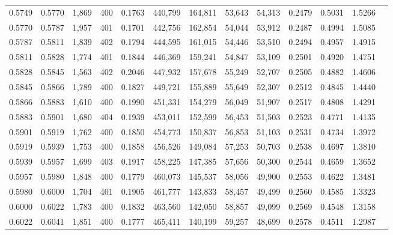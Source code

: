 \begin{tabular}{rrrrrrrrrrrrr}
0.5749 & 0.5770 & 1,869 & 400 &                                     0.1763 & 440,799 & 164,811 &  53,643 &  54,313 & 0.2479 & 0.5031 & 1.5266 \\
0.5770 & 0.5787 & 1,957 & 401 &                                     0.1701 & 442,756 & 162,854 &  54,044 &  53,912 & 0.2487 & 0.4994 & 1.5085 \\
0.5787 & 0.5811 & 1,839 & 402 &                                     0.1794 & 444,595 & 161,015 &  54,446 &  53,510 & 0.2494 & 0.4957 & 1.4915 \\
0.5811 & 0.5828 & 1,774 & 401 &                                     0.1844 & 446,369 & 159,241 &  54,847 &  53,109 & 0.2501 & 0.4920 & 1.4751 \\
0.5828 & 0.5845 & 1,563 & 402 &                                     0.2046 & 447,932 & 157,678 &  55,249 &  52,707 & 0.2505 & 0.4882 & 1.4606 \\
0.5845 & 0.5866 & 1,789 & 400 &                                     0.1827 & 449,721 & 155,889 &  55,649 &  52,307 & 0.2512 & 0.4845 & 1.4440 \\
0.5866 & 0.5883 & 1,610 & 400 &                                     0.1990 & 451,331 & 154,279 &  56,049 &  51,907 & 0.2517 & 0.4808 & 1.4291 \\
0.5883 & 0.5901 & 1,680 & 404 &                                     0.1939 & 453,011 & 152,599 &  56,453 &  51,503 & 0.2523 & 0.4771 & 1.4135 \\
0.5901 & 0.5919 & 1,762 & 400 &                                     0.1850 & 454,773 & 150,837 &  56,853 &  51,103 & 0.2531 & 0.4734 & 1.3972 \\
0.5919 & 0.5939 & 1,753 & 400 &                                     0.1858 & 456,526 & 149,084 &  57,253 &  50,703 & 0.2538 & 0.4697 & 1.3810 \\
0.5939 & 0.5957 & 1,699 & 403 &                                     0.1917 & 458,225 & 147,385 &  57,656 &  50,300 & 0.2544 & 0.4659 & 1.3652 \\
0.5957 & 0.5980 & 1,848 & 400 &                                     0.1779 & 460,073 & 145,537 &  58,056 &  49,900 & 0.2553 & 0.4622 & 1.3481 \\
0.5980 & 0.6000 & 1,704 & 401 &                                     0.1905 & 461,777 & 143,833 &  58,457 &  49,499 & 0.2560 & 0.4585 & 1.3323 \\
0.6000 & 0.6022 & 1,783 & 400 &                                     0.1832 & 463,560 & 142,050 &  58,857 &  49,099 & 0.2569 & 0.4548 & 1.3158 \\
0.6022 & 0.6041 & 1,851 & 400 &                                     0.1777 & 465,411 & 140,199 &  59,257 &  48,699 & 0.2578 & 0.4511 & 1.2987 \\

\end{tabular}
